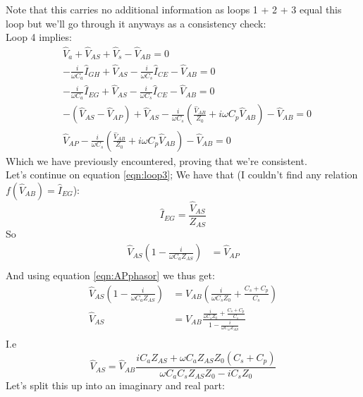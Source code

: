 Note that this carries no additional information as loops 1 + 2 + 3 equal this loop but we'll go through it anyways
as a consistency check:\\
Loop 4 implies:
\begin{eqnarray}
	&\hat{V}_a + \hat{V}_{AS} + \hat{V}_s - \hat{V}_{AB} = 0\\
	&-\frac{i}{\omega C_a}\hat{I}_{GH} + \hat{V}_{AS} - \frac{i}{\omega C_s} \hat{I}_{CE} - \hat{V}_{AB} = 0\\
	&-\frac{i}{\omega C_a}\hat{I}_{EG} + \hat{V}_{AS} - \frac{i}{\omega C_s} \hat{I}_{CE} - \hat{V}_{AB} = 0\\
	&-\left( \hat{V}_{AS}  - \hat{V}_{AP}\right) + \hat{V}_{AS} - \frac{i}{\omega C_s}\left(\frac{\hat{V}_{AB}}{Z_0} + i\omega C_p\hat{V}_{AB}\right) - \hat{V}_{AB} = 0\\
	&\hat{V}_{AP} - \frac{i}{\omega C_s}\left(\frac{\hat{V}_{AB}}{Z_0} + i\omega C_p\hat{V}_{AB}\right) - \hat{V}_{AB} = 0
\end{eqnarray}
Which we have previously encountered, proving that we're consistent.\\
Let's continue on equation \ref{eqn:loop3};
We have that (I couldn't find any relation $f(\hat{V}_{AB}) = \hat{I}_{EG}$):
\begin{equation}
	\hat{I}_{EG} = \frac{\hat{V}_{AS}}{Z_{AS}}
\end{equation}
So
\begin{eqnarray}
	\hat{V}_{AS}\left(1  - \frac{i}{\omega C_a Z_{AS}}\right) &= \hat{V}_{AP}\\
\end{eqnarray}
And using equation \ref{eqn:APphasor} we thus get:
\begin{eqnarray}
	\hat{V}_{AS}\left(1  - \frac{i}{\omega C_a Z_{AS}}\right) &= \hat{V}_{AB}\left(\frac{i}{\omega C_s Z_0} + \frac{C_s + C_p}{C_s}\right)\\
	\hat{V}_{AS} &= \hat{V}_{AB}\frac{\frac{i}{\omega C_s Z_0} + \frac{C_s + C_p}{C_s}}{1  - \frac{i}{\omega C_a Z_{AS}}}\\
\end{eqnarray}
I.e
\begin{equation}
	\hat{V}_{AS} = \hat{V}_{AB}\frac{i C_a Z_{AS} + \omega C_a Z_{AS} Z_0(C_s + C_p)}{\omega C_a C_s Z_{AS} Z_0 - iC_s Z_0}
\end{equation}
Let's split this up into an imaginary and real part:
